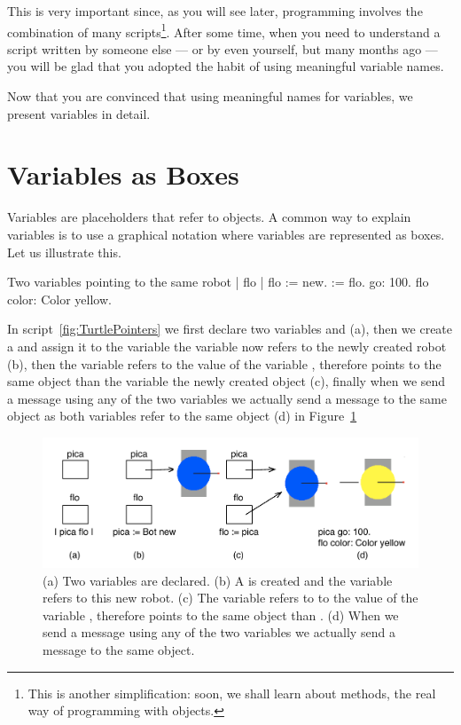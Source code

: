 This is very important since, as you will see later, programming involves the combination of many scripts\footnote{This is another simplification: soon, we shall learn about methods, the real way of programming with objects.}. After some time, when you need to
understand a script written by someone else --- or by even yourself, but many months ago --- you will be glad that you adopted the habit of using meaningful variable names.

Now that you are convinced that using meaningful names for variables, we present variables in detail.


\section{Variables as Boxes} 
Variables are placeholders that refer to objects. A common way to explain variables is to use a graphical notation where variables are represented as boxes. Let us illustrate this. 

\begin{scriptwithtitle}{Two variables pointing to the same robot}\label{fig:TurtlePointers}
| \caro flo |
flo := \Turtle new.
\caro := flo.
\caro go: 100.
flo color: Color yellow.
\end{scriptwithtitle}

In script~\ref{fig:TurtlePointers} we first declare two variables  and  (a), then we create a \Turtle and assign it to the variable \ct{\caro} \ie the variable  now refers to the newly created robot (b), then the variable  refers to the value of the variable \ct{\caro}, therefore  points to the same object than the variable \ct{\caro} \ie the newly created object (c), finally when we send a message using any of the two variables we actually send a message to the same object as both variables refer to the same object (d) in Figure~\ref{fig:boxesPointerRepresentation}



\begin{figure}
\begin{center}
\centerline{\includegraphics[width=15cm]{boxesPointer}}
\caption{(a) Two variables are declared. (b) A \Turtle is created and the variable \ct{\caro} refers to this new robot. (c) The variable  refers to  to the value of the variable \ct{\caro}, therefore  points to the same object than \ct{\caro}. (d) When we send a message using any of the two variables we actually send a message to the same object.\label{fig:boxesPointerRepresentation}}
\end{center}
\end{figure}


